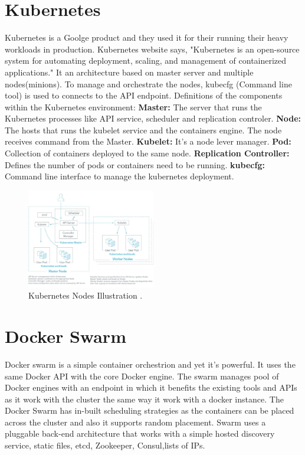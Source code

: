 \documentclass[sigconf]{acmart}
\begin{document}
	\section{Kubernetes}
	Kubernetes is a Goolge product and they used it for their running their heavy workloads in production.	
	Kubernetes website says, "Kubernetes is an open-source system for automating deployment, scaling, and management of containerized applications."
	It an architecture based on master server and multiple nodes(minions). To manage and orchestrate the nodes, kubecfg (Command line tool) is
	used to connects to the API endpoint.
	Definitions of the components within the Kubernetes environment:\newline
	\textbf{Master:} The server that runs the Kubernetes processes like API service, scheduler and replication controler.\newline
	\textbf{Node:} The hosts that runs the kubelet service and the containers engine. The node receives command from the Master.\newline
	\textbf{Kubelet:} It's a node lever manager.\newline
	\textbf{Pod:} Collection of containers deployed to the same node.\newline
	\textbf{Replication Controller:} Defines the number of pods or containers need to be running.\newline
	\textbf{kubecfg:} Command line interface to manage the kubernetes deployment. \newline
	\cite{Kubernetes}
	\begin{figure}[h]
		\includegraphics[width=0.5\textwidth]{images/Kubernetes}
		\caption{Kubernetes Nodes Illustration \cite{Platform9}.} \label{fig:figure1} 
	\end{figure}
	
	\section{Docker Swarm}
	Docker swarm is a simple container orchestrion and yet it's powerful. It uses the same Docker API with the core Docker engine. The swarm manages pool of 
	Docker engines with an endpoint in which it benefits the existing tools and APIs as it work with the cluster the same way it work with a docker instance.
	The Docker Swarm has in-built scheduling strategies as the containers can be placed across the cluster and also it supports random placement.
	Swarm uses a pluggable back-end architecture that works with a simple hosted discovery service, static files, etcd, Zookeeper, Consul,lists of IPs.
	
\end{document}
